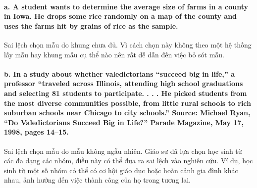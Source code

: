 \documentclass[
]{article}
\begin{document}
\hypertarget{a.-a-student-wants-to-determine-the-average-size-of-farms-in-a-county-in-iowa.-he-drops-some-rice-randomly-on-a-map-of-the-county-and-uses-the-farms-hit-by-grains-of-rice-as-the-sample.}{%
\paragraph{a. A student wants to determine the average size of farms in
a county in Iowa. He drops some rice randomly on a map of the county and
uses the farms hit by grains of rice as the
sample.}\label{a.-a-student-wants-to-determine-the-average-size-of-farms-in-a-county-in-iowa.-he-drops-some-rice-randomly-on-a-map-of-the-county-and-uses-the-farms-hit-by-grains-of-rice-as-the-sample.}}

Sai lệch chọn mẫu do khung chưa đủ. Vì cách chọn này không theo một hệ
thống lấy mẫu hay khung mẫu cụ thể nào nên rất dễ dẫn đến việc bỏ sót
mẫu.

\hypertarget{b.-in-a-study-about-whether-valedictorians-succeed-big-in-life-a-professor-traveled-across-illinois-attending-high-school-graduations-and-selecting-81-students-to-participate.-.-.-.-he-picked-students-from-the-most-diverse-communities-possible-from-little-rural-schools-to-rich-suburban-schools-near-chicago-to-city-schools.-source-michael-ryan-do-valedictorians-succeed-big-in-life-parade-magazine-may-17-1998-pages-1415.}{%
\paragraph{b. In a study about whether valedictorians ``succeed big in
life,'' a professor ``traveled across Illinois, attending high school
graduations and selecting 81 students to participate. . . . He picked
students from the most diverse communities possible, from little rural
schools to rich suburban schools near Chicago to city schools.'' Source:
Michael Ryan, ``Do Valedictorians Succeed Big in Life?'' Parade
Magazine, May 17, 1998, pages
14--15.}\label{b.-in-a-study-about-whether-valedictorians-succeed-big-in-life-a-professor-traveled-across-illinois-attending-high-school-graduations-and-selecting-81-students-to-participate.-.-.-.-he-picked-students-from-the-most-diverse-communities-possible-from-little-rural-schools-to-rich-suburban-schools-near-chicago-to-city-schools.-source-michael-ryan-do-valedictorians-succeed-big-in-life-parade-magazine-may-17-1998-pages-1415.}}

Sai lệch chọn mẫu do mẫu không ngẫu nhiên. Giáo sư đã lựa chọn học sinh
từ các đa dạng các nhóm, điều này có thể đưa ra sai lệch vào nghiên cứu.
Ví dụ, học sinh từ một số nhóm có thể có cơ hội giáo dục hoặc hoàn cảnh
gia đình khác nhau, ảnh hưởng đến việc thành công của họ trong tương
lai.
\end{document}
